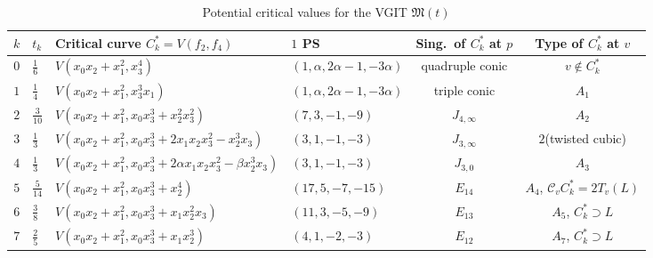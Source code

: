 \documentclass[11pt]{amsart}
\numberwithin{equation}{section}
\theoremstyle{plain}
\theoremstyle{remark}
\theoremstyle{definition}
\newcommand{\cC}{{\mathscr C}}
\newcommand{\gM}{\mathfrak{M}}
\begin{document}
\begin{table}[htb!]
\renewcommand\arraystretch{1.5}
\begin{tabular}{|c| l | l | l |c|c|}
\hline
$k$&$t_k$& Critical curve $C_k^{*}=V(f_2,f_4)$ & $1$ PS & Sing.~of $C^{*}_k$ at $p$ & Type of $C^{*}_k$ at $v$\\
%
\hline
$0$&$\frac{1}{6}$&$V(x_0x_2+x_1^2,x_3^4)$& $(1,\alpha,2\alpha-1,-3\alpha)$ & quadruple conic&$v\not\in C^{*}_k$\\
%
\hline
$1$&$\frac{1}{4}$&$V(x_0x_2+x_1^2,x_3^3x_1)$ &  $(1,\alpha,2\alpha-1,-3\alpha)$ &  triple conic&$A_1$\\
%
\hline
$2$&$\frac{3}{10}$&$V(x_0x_2+x_1^2,x_0x_3^3+x_2^2x_3^2)$& $(7,3,-1,-9)$ & $J_{4,\infty}$&$A_2$\\
%
\hline $3$ &$\frac{1}{3}$ &$V(x_0x_2+x_1^2,x_0x_3^3+2x_1x_2x_3^2-x_2^3x_3)$& $(3,1,-1,-3)$ & $J_{3,\infty}$& $2$(twisted cubic)\\
%
\hdashline $4$&$\frac{1}{3}$ &$V(x_0x_2+x_1^2,x_0x_3^3+2\alpha x_1x_2x_3^2-\beta x_2^3x_3)$ & 
 $(3,1,-1,-3)$   &$J_{3,0}$&$A_3$\\
%
\hline
$5$&$\frac{5}{14}$&$V(x_0x_2+x_1^2,x_0x_3^3+x_2^4)$& $(17,5,-7,-15)$  &$E_{14}$&$A_4$, $\cC_v C^{*}_k=2T_v(L)$\\
%
\hline
$6$&$\frac{3}{8}$&$V(x_0x_2+x_1^2,x_0x_3^3+x_1x_2^2x_3)$& $(11,3,-5,-9)$  & $E_{13}$& $A_5$, $C^{*}_k\supset L$\\
%
\hline
$7$&$\frac{2}{5}$&$V(x_0x_2+x_1^2,x_0x_3^3+x_1x_2^3)$& $(4,1,-2,-3)$  & $E_{12}$& $A_7$, $C^{*}_k\supset L$\\
%
\hline
\end{tabular}
\vspace{0.2cm}
\caption{Potential critical values for the VGIT $\gM(t)$}\label{table101}
\end{table}
%
\end{document}
